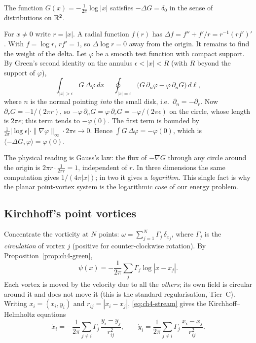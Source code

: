 \begin{proposition}\label{prop:ch4-green}
The function $G(x) = -\frac{1}{2\pi}\log|x|$ satisfies $-\Delta G = \delta_0$ in the sense of distributions on
$\mathbb{R}^2$.
\end{proposition}
\begin{humanproof}
For $x\neq0$ write $r=|x|$. A radial function $f(r)$ has $\Delta f = f'' + f'/r = r^{-1}(r f')'$. With
$f=\log r$, $rf'=1$, so $\Delta \log r = 0$ away from the origin. It remains to find the weight of the delta. Let
$\varphi$ be a smooth test function with compact support. By Green's second identity on the annulus
$\epsilon<|x|<R$ (with $R$ beyond the support of $\varphi$),
\[
\int_{|x|>\epsilon} G\,\Delta\varphi\,dx
= \oint_{|x|=\epsilon}\bigl(G\,\partial_n\varphi - \varphi\,\partial_n G\bigr)\,d\ell ,
\]
where $n$ is the normal pointing \emph{into} the small disk, i.e.\ $\partial_n = -\partial_r$. Now
$\partial_r G = -1/(2\pi r)$, so $-\varphi\,\partial_n G = \varphi\,\partial_r G = -\varphi/(2\pi\epsilon)$ on the
circle, whose length is $2\pi\epsilon$; this term tends to $-\varphi(0)$. The first term is bounded by
$\frac{1}{2\pi}|\log\epsilon|\cdot\|\nabla\varphi\|_\infty\cdot 2\pi\epsilon\to 0$. Hence
$\int G\,\Delta\varphi = -\varphi(0)$, which is $\langle -\Delta G,\varphi\rangle = \varphi(0)$.
\end{humanproof}

The physical reading is Gauss's law: the flux of $-\nabla G$ through any circle around the origin is
$2\pi r\cdot \frac{1}{2\pi r}=1$, independent of $r$. In three dimensions the same computation gives
$1/(4\pi|x|)$; in two it gives a \emph{logarithm}. This single fact is why the planar point-vortex system is the
logarithmic case of our energy problem.

\subsection{Kirchhoff's point vortices}
Concentrate the vorticity at $N$ points: $\omega = \sum_{j=1}^N \Gamma_j\,\delta_{x_j}$, where $\Gamma_j$ is the
\emph{circulation} of vortex $j$ (positive for counter-clockwise rotation). By Proposition~\ref{prop:ch4-green},
\[
\psi(x) = -\frac{1}{2\pi}\sum_{j}\Gamma_j\log|x-x_j| .
\]
Each vortex is moved by the velocity due to all the \emph{others}; its own field is circular around it and does not
move it (this is the standard regularisation, Tier~C). Writing $x_i=(x_i,y_i)$ and
$r_{ij}=|x_i-x_j|$, \eqref{eq:ch4-stream} gives the Kirchhoff--Helmholtz equations
\begin{equation}\label{eq:ch4-kirchhoff}
\dot x_i = -\frac{1}{2\pi}\sum_{j\neq i}\Gamma_j\,\frac{y_i-y_j}{r_{ij}^2},\qquad
\dot y_i = \frac{1}{2\pi}\sum_{j\neq i}\Gamma_j\,\frac{x_i-x_j}{r_{ij}^2}.
\end{equation}

